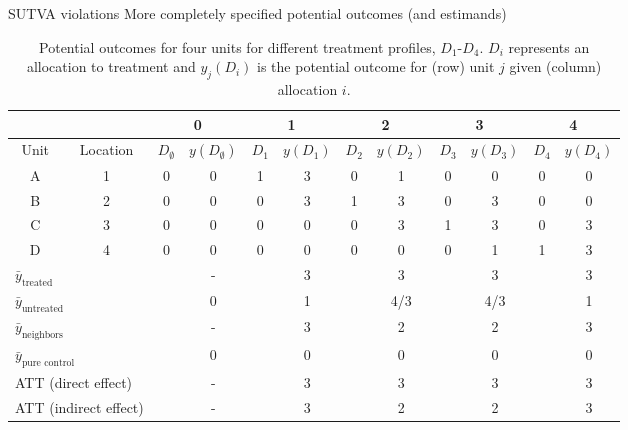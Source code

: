 \documentclass[
  11pt,
  ignorenonframetext,
]{beamer}
\begin{document}
\begin{frame}{SUTVA violations}
\protect\hypertarget{sutva-violations}{}
More completely specified potential outcomes (and estimands)

\begin{table}
\scriptsize
\begin{center}
\tiny
\begin{tabular}{cc|cc|cc|cc|cc|cc}
     & & \multicolumn{2}{c}{0} & \multicolumn{2}{c}{1} & \multicolumn{2}{c}{2}  & \multicolumn{2}{c}{3}& \multicolumn{2}{c}{4}\\ \hline 
    Unit    &   Location&   $D_\emptyset$ & $y(D_\emptyset)$ & $D_1$        & $y(D_1)$  &  $D_2$        & $y(D_2)$   &$D_3$     & $y(D_3)$    &$D_4$        & $y(D_4)$    \\
    \hline
    A&  1 & 0 & 0 & 1 &3 &0 &1 & 0 & 0 &0 &0\\
    B & 2 & 0 & 0 & 0 &3 &1 &3 & 0 & 3 &0 &0\\
    C & 3 & 0 & 0 & 0 &0 &0 &3 & 1 & 3 &0 &3\\
    D & 4 & 0 & 0 & 0 &0 &0 &0 & 0 & 1 &1 &3\\
    \hline\hline
\multicolumn{2}{l|}{$\bar{y}_\text{treated}$} && - && 3 && 3 && 3 && 3  \\ 
\multicolumn{2}{l|}{$\bar{y}_\text{untreated}$} && 0 && 1 && 4/3 && 4/3 && 1  \\ 
\multicolumn{2}{l|}{$\bar{y}_\text{neighbors}$} && - && 3 && 2 && 2 && 3  \\ 
\multicolumn{2}{l|}{$\bar{y}_\text{pure control}$} && 0 && 0 && 0 && 0 && 0  \\ 
\hline
\multicolumn{2}{l|}{ATT (direct effect)} && - && 3 && 3 && 3  && 3 \\ 
\multicolumn{2}{l|}{ATT (indirect effect)} && - && 3 && 2 && 2 && 3  \\ 

    \hline
    \end{tabular}
    \end{center}

    \caption{Potential outcomes for four units for different treatment profiles, $D_1$-$D_4$. $D_i$ represents an allocation to treatment and $y_j(D_i)$ is the potential outcome for (row) unit $j$ given (column) allocation $i$.}
\label{PotentialOutcomes112}

\end{table}
\end{frame}
\end{document}
